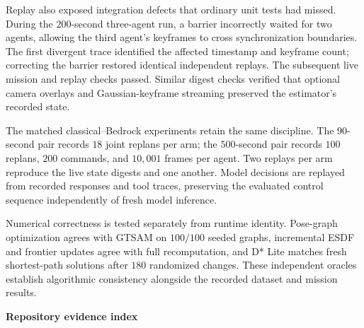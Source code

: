 \documentclass[10pt,a4paper]{article}
\newcommand{\indentedheading}[1]{\par\addvspace{0.65em}\noindent\hspace*{1em}\textbf{#1}\par\smallskip}
\begin{document}
Replay also exposed integration defects that ordinary unit
tests had missed. During the $200$-second three-agent run,
a barrier incorrectly waited for two agents, allowing the
third agent's keyframes to cross synchronization boundaries.
The first divergent trace identified the affected timestamp
and keyframe count; correcting the barrier restored identical
independent replays. The subsequent live mission and replay
checks passed. Similar digest checks verified that optional
camera overlays and Gaussian-keyframe streaming preserved
the estimator's recorded state.

The matched classical--Bedrock experiments retain the same
discipline. The $90$-second pair records $18$ joint replans
per arm; the $500$-second pair records $100$ replans,
$200$ commands, and $10{,}001$ frames per agent.
Two replays per arm reproduce the live state digests and
one another. Model decisions are replayed from recorded
responses and tool traces, preserving the evaluated control
sequence independently of fresh model inference.

Numerical correctness is tested separately from runtime
identity. Pose-graph optimization agrees with GTSAM on
$100/100$ seeded graphs, incremental ESDF and frontier
updates agree with full recomputation, and D* Lite matches
fresh shortest-path solutions after $180$ randomized changes.
These independent oracles establish algorithmic consistency
alongside the recorded dataset and mission results.

\indentedheading{Repository evidence index}
\end{document}
